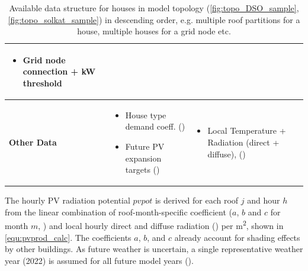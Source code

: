 \documentclass[12PT, ]{article}
\begin{document}
\begin{table}[bth]
\begin{tabularx}{\linewidth}{|l X X|}
\begin{itemize}[nosep,leftmargin=0.8em]
      \item Grid node connection + kW threshold
    \end{itemize} 
    & 
    \\
    \hline
    \textbf{Other Data} &
    \begin{itemize}[nosep,leftmargin=0.8em]
      \item House type demand coeff. (\cite{swissstore2022})
      \item Future PV expansion targets (\cite{bfe_ep2050_2020})
    \end{itemize} & 
    \begin{itemize}[nosep,leftmargin=0.8em]
      \item Local Temperature + Radiation (direct + diffuse), (\cite{meteoblue2023})
    \end{itemize} 
    \\
    \hline
    \end{tabularx}
    \caption{{ \footnotesize Available data structure for houses in model topology (\ref{fig:topo_DSO_sample}, \ref{fig:topo_solkat_sample}) in descending order, e.g. multiple roof partitions for a house, multiple houses for a grid node etc.} }
    \label{tab:optimalpv_data_structure}
\end{table}

The hourly PV radiation potential $pvpot$ is derived for each roof $j$ and hour $h$ from the linear combination of roof-month-specific coefficient ($a$, $b$ and $c$ for month $m$, \cite{solkat2023}) and local hourly direct and diffuse radiation (\cite{meteoblue2023}) per m\textsuperscript{2}, shown in \ref{equ:pvprod_calc}. The coefficients $a$, $b$, and $c$ already account for shading effects by other buildings.
As future weather is uncertain, a single representative weather year (2022) is assumed for all future model years (\cite{meteoblue2023}).
\end{document}

